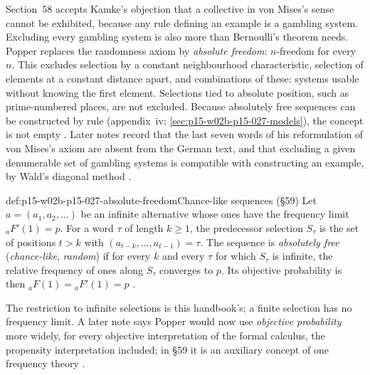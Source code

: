 Section~58 accepts Kamke's objection that a collective in von Mises's
sense cannot be exhibited, because any rule defining an example is a
gambling system. Excluding every gambling system is also more than
Bernoulli's theorem needs. Popper replaces the randomness axiom by
\emph{absolute freedom}: \(n\)-freedom for every \(n\). This excludes
selection by a constant neighbourhood characteristic, selection of
elements at a constant distance apart, and combinations of these:
systems usable without knowing the first element. Selections tied to
absolute position, such as prime-numbered places, are not excluded.
Because absolutely free sequences can be constructed by rule
(appendix~iv; \cref{sec:p15-w02b-p15-027-models}), the concept is not empty
\parencite[\S58]{Popper2002LogicDiscoveryUI}.
Later notes record that the last seven words of his reformulation of von
Mises's axiom are absent from the German text, and that excluding a given
denumerable set of gambling systems is compatible with constructing an
example, by Wald's diagonal method
\parencite[\S58, notes~*1, *2]{Popper2002LogicDiscoveryUI}.

\begin{hbdefinition}{def:p15-w02b-p15-027-absolute-freedom}{Chance-like sequences (\S59)}
Let \(a=(a_1,a_2,\ldots)\) be an infinite alternative whose ones have the
frequency limit \({}_{a}F'(1)=p\). For a word \(\tau\) of length
\(k\geq1\), the predecessor selection \(S_\tau\) is the set of positions
\(t>k\) with \((a_{t-k},\ldots,a_{t-1})=\tau\). The sequence is
\emph{absolutely free} (\emph{chance-like}, \emph{random}) if for every
\(k\) and every \(\tau\) for which \(S_\tau\) is infinite, the relative
frequency of ones along \(S_\tau\) converges to \(p\). Its objective
probability is then \({}_{a}F(1)={}_{a}F'(1)=p\)
\parencite[\S59]{Popper2002LogicDiscoveryUI}.
\end{hbdefinition}

The restriction to infinite selections is this handbook's; a finite
selection has no frequency limit. A later note says Popper would now use
\emph{objective probability} more widely, for every objective
interpretation of the formal calculus, the propensity interpretation
included; in \S59 it is an auxiliary concept of one frequency theory
\parencite[\S59, note~*1]{Popper2002LogicDiscoveryUI}.

